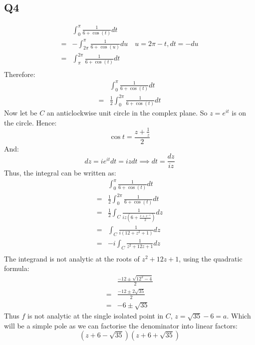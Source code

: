 \documentclass[a4paper, 11pt]{article}
\begin{document}
\begin{multicols}{2}
	\section*{Q4}
	\begin{align*}
		  & \int_{0}^{\pi}\frac{1}{6+\cos\left(t\right)}dt                                \\
		= & - \int_{2\pi}^{\pi}\frac{1}{6+\cos\left(u \right)}du\quad u=2\pi-t, dt = - du \\
		= & \int_{\pi}^{2\pi}\frac{1}{6+\cos\left(t\right)}dt                             \\
	\end{align*}
	Therefore:
	\begin{align*}
		  & \int_{0}^{\pi}\frac{1}{6+\cos\left(t\right)}dt           \\
		= & \frac 12 \int_{0}^{2\pi}\frac{1}{6+\cos\left(t\right)}dt
	\end{align*}
	Now let be $C$ an anticlockwise unit circle in the complex plane. So $z=e^{it}$ is on the circle. Hence:
	$$\cos t = \frac{z+\frac 1z}2$$
	And:
	$$dz= ie^{it}dt=izdt \implies dt = \frac {dz}{iz}$$
	Thus, the integral can be written as:
	\begin{align*}
		  & \int_{0}^{\pi}\frac{1}{6+\cos\left(t\right)}dt                 \\
		= & \frac 12 \int_{0}^{2\pi}\frac{1}{6+\cos\left(t\right)}dt       \\
		= & \frac 12 \int_C\frac{1}{iz\left( 6+\frac{z+z^{-1}}2 \right)}dz \\
		= & \int_C\frac{1}{i\left( 12+z^2+1 \right)}dz                     \\
		= & -i\int_C\frac{1}{ z^2+12z+1 }dz                                \\
	\end{align*}
	The integrand is not analytic at the roots of $z^2+12z+1$, using the quadratic formula:
	\begin{align*}
		  & \frac{-12\pm \sqrt{12^2-4}}{2} \\
		= & \frac{-12\pm 2\sqrt{35}}{2}    \\
		= & -6\pm \sqrt{35}
	\end{align*}
	Thus $f$ is not analytic at the single isolated point in $C$, $z=\sqrt{35}-6=a$. Which will be a simple pole as we can factorise the denominator into linear factors:
	$$(z+6-\sqrt{35})(z+6+\sqrt{35})$$


\end{multicols}
\end{document}
